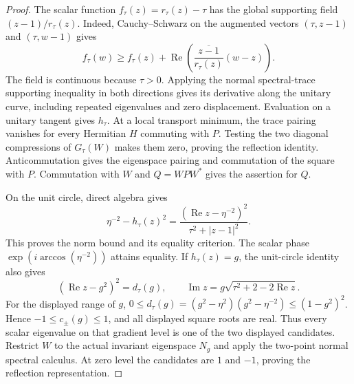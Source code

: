 \begin{proof}
The scalar function $f_\tau(z)=r_\tau(z)-\tau$ has the global supporting
field $(z-1)/r_\tau(z)$. Indeed, Cauchy--Schwarz on the augmented vectors
$(\tau,z-1)$ and $(\tau,w-1)$ gives
\[
 f_\tau(w)\geq f_\tau(z)+
 \operatorname{Re}\!\left(
    \overline{\frac{z-1}{r_\tau(z)}}(w-z)\right).
\]
The field is continuous because $\tau>0$. Applying the normal
spectral-trace supporting inequality in both directions gives its
derivative along the unitary curve, including repeated eigenvalues and
zero displacement. Evaluation on a unitary tangent gives $h_\tau$.
At a local transport minimum, the trace pairing vanishes for every
Hermitian $H$ commuting with $P$. Testing the two diagonal compressions
of $G_\tau(W)$ makes them zero, proving the reflection identity.
Anticommutation gives the eigenspace pairing and commutation of the
square with $P$. Commutation with $W$ and $Q=WPW^*$ gives the assertion
for $Q$.

On the unit circle, direct algebra gives
\[
 \eta^{-2}-h_\tau(z)^2
       =\frac{(\operatorname{Re}z-\eta^{-2})^2}
                    {\tau^2+|z-1|^2}.
\]
This proves the norm bound and its equality criterion. The scalar phase
$\exp(i\arccos(\eta^{-2}))$ attains equality.
If $h_\tau(z)=g$, the unit-circle identity also gives
\[
 (\operatorname{Re}z-g^2)^2=d_\tau(g),\qquad
 \operatorname{Im}z=g\sqrt{\tau^2+2-2\operatorname{Re}z}.
\]
For the displayed range of $g$,
$0\leq d_\tau(g)=(g^2-\eta^2)(g^2-\eta^{-2})\leq(1-g^2)^2$.
Hence $-1\leq c_\pm(g)\leq1$, and all displayed square roots are real.
Thus every scalar eigenvalue on that gradient level is one of the two
displayed candidates. Restrict $W$ to the actual invariant eigenspace
$N_g$ and apply the two-point normal spectral calculus. At zero level
the candidates are $1$ and $-1$, proving the reflection representation.
\end{proof}

